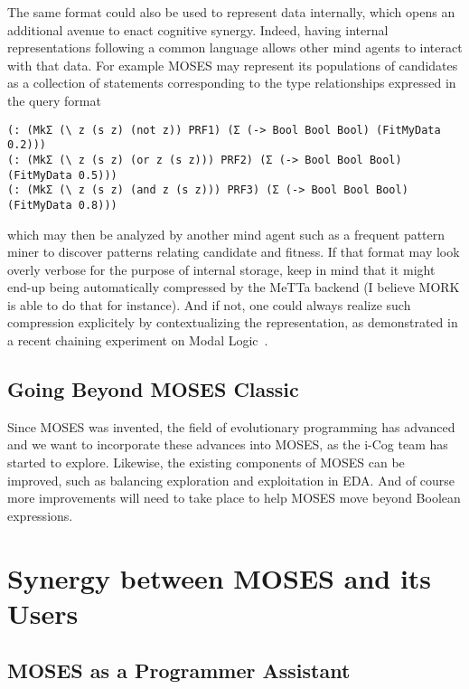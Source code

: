 \documentclass[]{report}
\begin{document}
The same format could also be used to represent data internally, which
opens an additional avenue to enact cognitive synergy.  Indeed, having
internal representations following a common language allows other mind
agents to interact with that data.  For example MOSES may represent
its populations of candidates as a collection of statements
corresponding to the type relationships expressed in the query format
\begin{footnotesize}
\begin{verbatim}
(: (MkΣ (\ z (s z) (not z)) PRF1) (Σ (-> Bool Bool Bool) (FitMyData 0.2)))
(: (MkΣ (\ z (s z) (or z (s z))) PRF2) (Σ (-> Bool Bool Bool) (FitMyData 0.5)))
(: (MkΣ (\ z (s z) (and z (s z))) PRF3) (Σ (-> Bool Bool Bool) (FitMyData 0.8)))
\end{verbatim}
\end{footnotesize}
which may then be analyzed by another mind agent such as a frequent
pattern miner to discover patterns relating candidate and fitness.  If
that format may look overly verbose for the purpose of internal
storage, keep in mind that it might end-up being automatically
compressed by the MeTTa backend (I believe MORK is able to do that for
instance).  And if not, one could always realize such compression
explicitely by contextualizing the representation, as demonstrated in
a recent chaining experiment on Modal Logic~\cite{ModalLogic}.

\subsection{Going Beyond MOSES Classic}

Since MOSES was invented, the field of evolutionary programming has
advanced and we want to incorporate these advances into MOSES, as the
i-Cog team has started to explore.  Likewise, the existing components
of MOSES can be improved, such as balancing exploration and
exploitation in EDA.  And of course more improvements will need to
take place to help MOSES move beyond Boolean expressions.

\section{Synergy between MOSES and its Users}

\subsection{MOSES as a Programmer Assistant}
\end{document}
